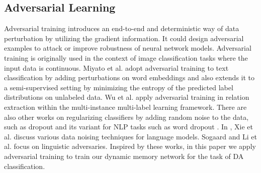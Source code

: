 \documentclass[conference]{IEEEtran}
\begin{document}
	\subsection{Adversarial Learning}
	Adversarial training \cite{goodfellow2015explaining} introduces an end-to-end and deterministic way of data perturbation by utilizing the gradient information. It could design adversarial examples to attack \cite{tramer2017ensemble} or improve robustness \cite{ wang2018not, zhang2018layerwise} of neural network models. Adversarial training is originally used in the context of image classiﬁcation tasks where the input data is continuous. Miyato et al. \cite{miyato2016adversarial} adopt adversarial training to text classiﬁcation by adding perturbations on word embeddings and also extends it to a semi-supervised setting by minimizing the entropy of the predicted label distributions on unlabeled data. Wu et al. \cite{wu2017adversarial} apply adversarial training in relation extraction within the multi-instance multi-label learning framework. There are also other works on regularizing classifiers by adding random noise to the data, such as dropout \cite{srivastava2014dropout} and its variant for NLP tasks such as word dropout \cite{iyyer2015deep}. In \cite{xie2017data}, Xie et al. discuss various data noising techniques for language models. Sogaard and Li et al. \cite{li2017robust} focus on linguistic adversaries. Inspired by these works, in this paper we apply adversarial training to train our dynamic memory network for the task of DA classification. %
	
\end{document}
